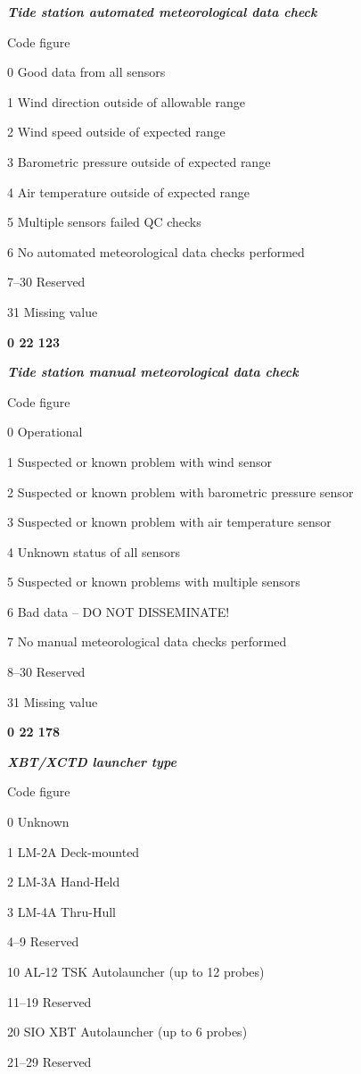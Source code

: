 \emph{\textbf{Tide station automated meteorological data check}}

Code figure

0 Good data from all sensors

1 Wind direction outside of allowable range

2 Wind speed outside of expected range

3 Barometric pressure outside of expected range

4 Air temperature outside of expected range

5 Multiple sensors failed QC checks

6 No automated meteorological data checks performed

7--30 Reserved

31 Missing value

\textbf{0 22 123}

\emph{\textbf{Tide station manual meteorological data check}}

Code figure

0 Operational

1 Suspected or known problem with wind sensor

2 Suspected or known problem with barometric pressure sensor

3 Suspected or known problem with air temperature sensor

4 Unknown status of all sensors

5 Suspected or known problems with multiple sensors

6 Bad data -- DO NOT DISSEMINATE!

7 No manual meteorological data checks performed

8--30 Reserved

31 Missing value

\textbf{0 22 178}

\emph{\textbf{XBT/XCTD launcher type}}

Code figure

0 Unknown

1 LM-2A Deck-mounted

2 LM-3A Hand-Held

3 LM-4A Thru-Hull

4--9 Reserved

10 AL-12 TSK Autolauncher (up to 12 probes)

11--19 Reserved

20 SIO XBT Autolauncher (up to 6 probes)

21--29 Reserved

